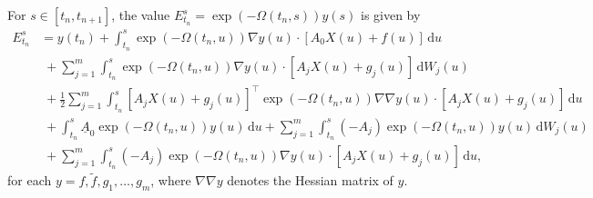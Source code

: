 \documentclass[10pt,a4paper]{amsart}
\begin{document}
\begin{lemma}\label{NewLemma4}
For $s\in[t_n,t_{n+1}]$, the value $E_{t_n}^s=\exp(-\Omega(t_n,s))y(s)$ is given by
\begin{align}
E_{t_n}^s&=y(t_n)+\int_{t_n}^s\exp(-\Omega(t_n,u))\nabla y(u)\!\cdot\![A_0X(u)+f(u)]\,\mathrm{d}u\nonumber\\
&\;+\sum_{j=1}^m\int_{t_n}^s\exp(-\Omega(t_n,u))\nabla y(u)\!\cdot\![A_jX(u)+g_j(u)]\,\mathrm{d}W_j(u)\label{ExpNegOmegatns}\\
&\;+\frac{1}{2}\sum_{j=1}^m\int_{t_n}^s[A_jX(u)+g_j(u)]^\intercal\exp(-\Omega(t_n,u))\nabla\nabla y(u)\!\cdot\![A_jX(u)+g_j(u)]\,\mathrm{d}u\nonumber\\
&\;+\int_{t_n}^s\underline{A}_0\exp(-\Omega(t_n,u))y(u)\,\mathrm{d}u+\sum_{j=1}^m\int_{t_n}^s(-A_j)\exp(-\Omega(t_n,u))y(u)\,\mathrm{d}W_j(u)\nonumber\\
&\;+\sum_{j=1}^m\int_{t_n}^s(-A_j)\exp(-\Omega(t_n,u))\nabla y(u)\!\cdot\![A_jX(u)+g_j(u)]\,\mathrm{d}u,\nonumber
\end{align}
for each $y=f,\tilde{f},g_1,\ldots,g_m$, where $\nabla\nabla y$ denotes the Hessian matrix of $y$.
\end{lemma}
\end{document}
